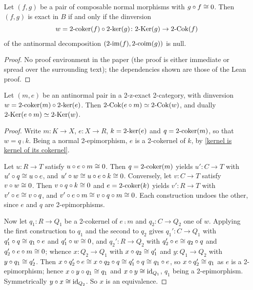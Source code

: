 \begin{corollary}
  \label{Cor Exact Null Dinversion}   \leanok
  Let \((f,g)\) be a pair of composable normal morphisms with \(g\circ f\cong 0\). Then \((f,g)\) is exact in \(B\) if and only if the dinversion
	\[
		w=2\text{-}\mathrm{coker}(f)\circ2\text{-}\mathrm{ker}(g)\colon2\text{-}\mathrm{Ker}(g)\to2\text{-}\mathrm{Cok}(f)
	\]
	of the antinormal decomposition \((2\text{-}\mathrm{im}(f),2\text{-}\mathrm{coim}(g))\) is null.
\end{corollary}

\begin{proof}
  \leanok
  No proof environment in the paper (the proof is either immediate or spread over the surrounding text); the dependencies shown are those of the Lean proof.
\end{proof}

\begin{lemma}
  \label{L:DinversionCoker}   \leanok
  Let \((m,e)\) be an antinormal pair in a 2-z-exact 2-category, with dinversion \(w=2\text{-}\mathrm{coker}(m)\circ2\text{-}\mathrm{ker}(e)\). Then \(2\text{-}\mathrm{Cok}(e\circ m)\simeq2\text{-}\mathrm{Cok}(w)\), and dually \(2\text{-}\mathrm{Ker}(e\circ m)\simeq2\text{-}\mathrm{Ker}(w)\).
\end{lemma}

\begin{proof}
  \leanok
  Write \(m\colon K\to X\), \(e\colon X\to R\), \(k=2\text{-}\mathrm{ker}(e)\) and \(q=2\text{-}\mathrm{coker}(m)\), so that \(w=q\comp k\). Being a normal 2-epimorphism, \(e\) is a 2-cokernel of \(k\), by \prox\ref{kernel is kernel of its cokernel}.

	Let \(u\colon R\to T\) satisfy \(u\circ e\circ m\cong 0\). Then \(q=2\text{-}\mathrm{coker}(m)\) yields \(u'\colon C\to T\) with \(u'\circ q\cong u\circ e\), and \(u'\circ w\cong u\circ e\circ k\cong 0\). Conversely, let \(v\colon C\to T\) satisfy \(v\circ w\cong 0\). Then \(v\circ q\circ k\cong 0\) and \(e=2\text{-}\mathrm{coker}(k)\) yields \(v'\colon R\to T\) with \(v'\circ e\cong v\circ q\), and \(v'\circ e\circ m\cong v\circ q\circ m\cong 0\). Each construction undoes the other, since \(e\) and \(q\) are 2-epimorphisms.

	Now let \(q_1\colon R\to Q_1\) be a 2-cokernel of \(e\comp m\) and \(q_2\colon C\to Q_2\) one of \(w\). Applying the first construction to \(q_1\) and the second to \(q_2\) gives \(q_1'\colon C\to Q_1\) with \(q_1'\circ q\cong q_1\circ e\) and \(q_1'\circ w\cong 0\), and \(q_2'\colon R\to Q_2\) with \(q_2'\circ e\cong q_2\circ q\) and \(q_2'\circ e\circ m\cong 0\); whence \(x\colon Q_2\to Q_1\) with \(x\circ q_2\cong q_1'\) and \(y\colon Q_1\to Q_2\) with \(y\circ q_1\cong q_2'\). Then \(x\circ q_2'\circ e\cong x\circ q_2\circ q\cong q_1'\circ q\cong q_1\circ e\), so \(x\circ q_2'\cong q_1\) as \(e\) is a 2-epimorphism; hence \(x\circ y\circ q_1\cong q_1\) and \(x\circ y\cong\operatorname{id}_{Q_1}\), \(q_1\) being a 2-epimorphism. Symmetrically \(y\circ x\cong\operatorname{id}_{Q_2}\). So \(x\) is an equivalence.
\end{proof}

